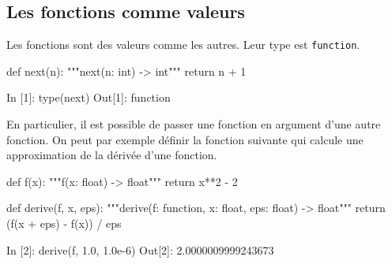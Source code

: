 \documentclass{magnolia}
\begin{document}
\subsection{Les fonctions comme valeurs}

Les fonctions sont des valeurs comme les autres. Leur type est \verb_function_.

\begin{pythoncodeline}
def next(n):
    """next(n: int) -> int"""
    return n + 1
\end{pythoncodeline}

\begin{pythoncode}
In [1]: type(next)
Out[1]: function
\end{pythoncode}

\noindent
En particulier, il est possible de passer une fonction en argument d'une autre fonction. On
peut par exemple définir la fonction suivante qui calcule une approximation de la dérivée
d'une fonction.

\begin{pythoncodeline}
def f(x):
    """f(x: float) -> float"""
    return x**2 - 2

def derive(f, x, eps):
    """derive(f: function, x: float, eps: float) -> float"""
    return (f(x + eps) - f(x)) / eps
\end{pythoncodeline}

\begin{pythoncode}
In [2]: derive(f, 1.0, 1.0e-6)
Out[2]: 2.0000009999243673
\end{pythoncode}
\end{document}
